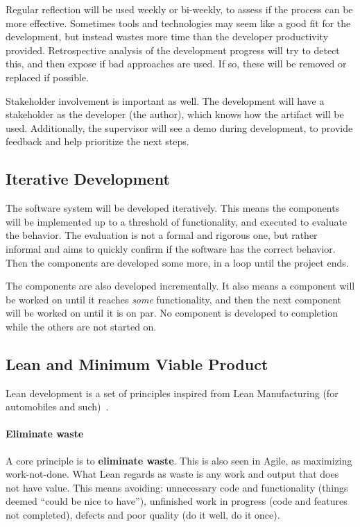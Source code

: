 Regular reflection will be used weekly or bi-weekly, to assess if the process can be more effective.
Sometimes tools and technologies may seem like a good fit for the development, but instead wastes more time than the developer productivity provided.
Retrospective analysis of the development progress will try to detect this, and then expose if bad approaches are used.
If so, these will be removed or replaced if possible.


Stakeholder involvement is important as well.
The development will have a stakeholder as the developer (the author), which knows how the artifact will be used.
Additionally, the supervisor will see a demo during development, to provide feedback and help prioritize the next steps.


\subsection{Iterative Development}

The software system will be developed iteratively.
This means the components will be implemented up to a threshold of functionality, and executed to evaluate the behavior.
The evaluation is not a formal and rigorous one, but rather informal and aims to quickly confirm if the software has the correct behavior.
Then the components are developed some more, in a loop until the project ends.


The components are also developed incrementally.
It also means a component will be worked on until it reaches \textit{some} functionality, and then the next component will be worked on until it is on par.
No component is developed to completion while the others are not started on.


\subsection{Lean and Minimum Viable Product}

Lean development is a set of principles inspired from Lean Manufacturing (for automobiles and such)~\cite{rachellelynnGuidingPrinciplesLean}.


\paragraph{Eliminate waste}
A core principle is to \textbf{eliminate waste}.
This is also seen in Agile, as maximizing work-not-done.
What Lean regards as waste is any work and output that does not have value.
This means avoiding: unnecessary code and functionality (things deemed ``could be nice to have''), unfinished work in progress (code and features not completed), defects and poor quality (do it well, do it once).


